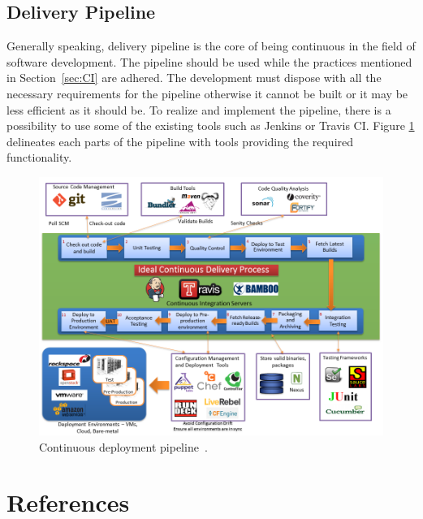 \documentclass[12pt,a4paper]{article}
\theoremstyle{definition}
\begin{document}
    \subsection{Delivery Pipeline}

        Generally speaking, delivery pipeline is the core of being continuous in the field of software development. The pipeline should be used while the practices mentioned in Section~\ref{sec:CI} are adhered. The development must dispose with all the necessary requirements for the pipeline otherwise it cannot be built or it may be less efficient as it should be. To realize and implement the pipeline, there is a possibility to use some of the existing tools such as Jenkins or Travis CI. Figure \ref{fig:pipeline} delineates each parts of the pipeline with tools providing the required functionality.

        \begin{figure}[H]
            \centering
            \includegraphics[scale=0.65]{img/pipeline.png}
            \caption{Continuous deployment pipeline~\cite{pipeline}.}
            \label{fig:pipeline}
        \end{figure}

\newpage

\section{References}

\begin{flushleft}
    
\end{flushleft}
\end{document}
